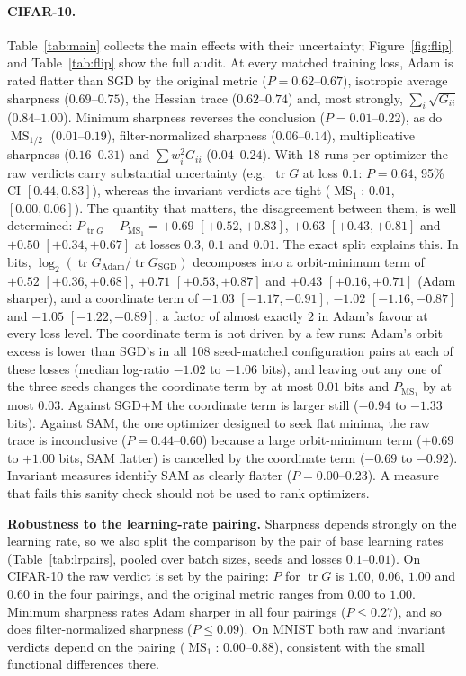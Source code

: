 \documentclass[10pt]{article}
\theoremstyle{remark}
\newcommand{\tr}{\operatorname{tr}}
\newcommand{\MS}{\operatorname{MS}}
\begin{document}
\paragraph{CIFAR-10.} Table~\ref{tab:main} collects the main effects with their uncertainty; Figure~\ref{fig:flip} and Table~\ref{tab:flip} show the full audit. At every matched training loss, Adam is rated flatter than SGD by the original metric ($P=0.62$--$0.67$), isotropic average sharpness ($0.69$--$0.75$), the Hessian trace ($0.62$--$0.74$) and, most strongly, $\sum_i\sqrt{G_{ii}}$ ($0.84$--$1.00$). Minimum sharpness reverses the conclusion ($P=0.01$--$0.22$), as do $\MS_{1/2}$ ($0.01$--$0.19$), filter-normalized sharpness ($0.06$--$0.14$), multiplicative sharpness ($0.16$--$0.31$) and $\sum w_i^2G_{ii}$ ($0.04$--$0.24$). With 18 runs per optimizer the raw verdicts carry substantial uncertainty (e.g.\ $\tr G$ at loss $0.1$: $P=0.64$, 95\% CI $[0.44,0.83]$), whereas the invariant verdicts are tight ($\MS_1$: $0.01$, $[0.00,0.06]$). The quantity that matters, the disagreement between them, is well determined: $P_{\tr G}-P_{\MS_1}=+0.69$ $[+0.52,+0.83]$, $+0.63$ $[+0.43,+0.81]$ and $+0.50$ $[+0.34,+0.67]$ at losses $0.3$, $0.1$ and $0.01$. The exact split explains this. In bits, $\log_2(\tr G_{\mathrm{Adam}}/\tr G_{\mathrm{SGD}})$ decomposes into a orbit-minimum term of $+0.52$ $[+0.36,+0.68]$, $+0.71$ $[+0.53,+0.87]$ and $+0.43$ $[+0.16,+0.71]$ (Adam sharper), and a coordinate term of $-1.03$ $[-1.17,-0.91]$, $-1.02$ $[-1.16,-0.87]$ and $-1.05$ $[-1.22,-0.89]$, a factor of almost exactly $2$ in Adam's favour at every loss level. The coordinate term is not driven by a few runs: Adam's orbit excess is lower than SGD's in all 108 seed-matched configuration pairs at each of these losses (median log-ratio $-1.02$ to $-1.06$ bits), and leaving out any one of the three seeds changes the coordinate term by at most $0.01$ bits and $P_{\MS_1}$ by at most $0.03$. Against SGD+M the coordinate term is larger still ($-0.94$ to $-1.33$ bits). Against SAM, the one optimizer designed to seek flat minima, the raw trace is inconclusive ($P=0.44$--$0.60$) because a large orbit-minimum term ($+0.69$ to $+1.00$ bits, SAM flatter) is cancelled by the coordinate term ($-0.69$ to $-0.92$). Invariant measures identify SAM as clearly flatter ($P=0.00$--$0.23$). A measure that fails this sanity check should not be used to rank optimizers.

\textbf{Robustness to the learning-rate pairing.} Sharpness depends strongly on the learning rate, so we also split the comparison by the pair of base learning rates (Table~\ref{tab:lrpairs}, pooled over batch sizes, seeds and losses $0.1$--$0.01$). On CIFAR-10 the raw verdict is set by the pairing: $P$ for $\tr G$ is $1.00$, $0.06$, $1.00$ and $0.60$ in the four pairings, and the original metric ranges from $0.00$ to $1.00$. Minimum sharpness rates Adam sharper in all four pairings ($P\le0.27$), and so does filter-normalized sharpness ($P\le0.09$). On MNIST both raw and invariant verdicts depend on the pairing ($\MS_1$: $0.00$--$0.88$), consistent with the small functional differences there.
\end{document}

